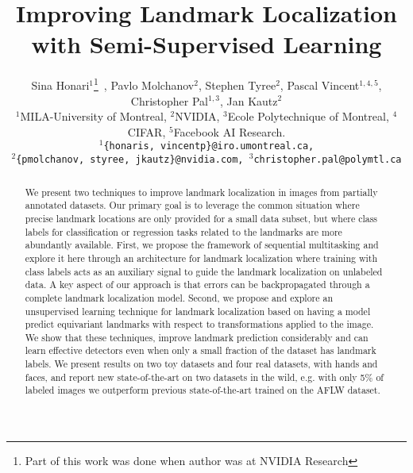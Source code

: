 \documentclass[10pt,twocolumn,letterpaper]{article}
\begin{document}
\title{Improving Landmark Localization with Semi-Supervised Learning}

\author{Sina Honari${^1}$\thanks{Part of this work was done when author was at NVIDIA Research} \,, Pavlo Molchanov${^2}$, Stephen Tyree${^2}$, Pascal Vincent${^{1,4,5}}$, Christopher Pal${^{1,3}}$, Jan Kautz${^2}$\\
{\normalsize ${^1}$MILA-University of Montreal, ${^2}$NVIDIA, ${^3}$Ecole Polytechnique of Montreal, ${^4}$CIFAR, ${^5}$Facebook AI Research.}\\
{\tt\small ${^1}$\{honaris, vincentp\}@iro.umontreal.ca,} \\
{\tt\small ${^2}$\{pmolchanov, styree, jkautz\}@nvidia.com, ${^3}$christopher.pal@polymtl.ca}}

\maketitle



\begin{abstract}
We present two techniques to improve landmark localization in images from partially annotated datasets. Our primary goal is to leverage the common situation where precise landmark locations are only provided for a small data subset, but where class labels for classification or regression tasks related to the landmarks are more abundantly available. 
First, we propose the framework of sequential multitasking and explore it here through an architecture for landmark localization where training with class labels acts as an auxiliary signal to guide the landmark localization on unlabeled data. A key aspect of our approach is that errors can be backpropagated through a complete landmark localization model. Second, we propose and explore an unsupervised learning technique for landmark localization based on having a model predict equivariant landmarks with respect to transformations applied to the image. We show that these techniques, improve landmark prediction considerably and can learn effective detectors even when only a small fraction of the dataset has landmark labels. We present results on two toy datasets and four real datasets, with hands and faces, and report new state-of-the-art on two datasets in the wild, e.g. with only 5\% of labeled images we outperform previous state-of-the-art trained on the AFLW dataset. 
\end{abstract}
\end{document}
